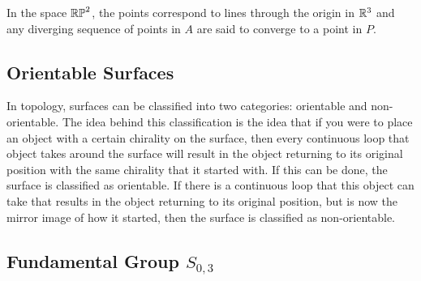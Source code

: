 \documentclass{amsart}
\begin{document}
In the space $\mathbb{RP}^2$, the points correspond to lines through the origin in $\mathbb{R}^3$ and any diverging sequence of points in $A$ are said to converge to a point in $P$.

\subsection{Orientable Surfaces}

In topology, surfaces can be classified into two categories: orientable and non-orientable. The idea behind this classification is the idea that if you were to place an object with a certain chirality on the surface, then every continuous loop that object takes around the surface will result in the object returning to its original position with the same chirality that it started with. If this can be done, the surface is classified as orientable. If there is a continuous loop that this object can take that results in the object returning to its original position, but is now the mirror image of how it started, then the surface is classified as non-orientable. 

\subsection{Fundamental Group $S_{0,3}$}

\end{document}
